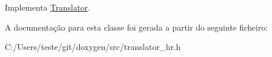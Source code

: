 Implementa \hyperlink{class_translator}{Translator}.



A documentação para esta classe foi gerada a partir do seguinte ficheiro\-:\begin{DoxyCompactItemize}
\item 
C\-:/\-Users/teste/git/doxygen/src/translator\-\_\-hr.\-h\end{DoxyCompactItemize}
